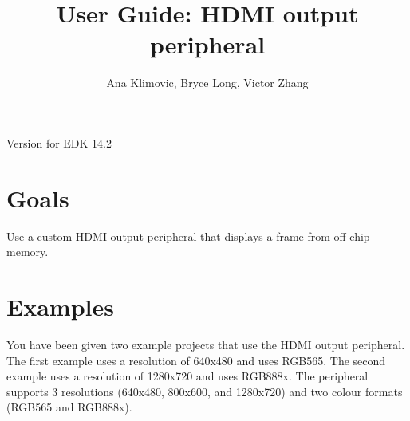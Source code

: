 \documentclass[12pt]{article}
\title{User Guide: HDMI output peripheral}
\author{Ana Klimovic, Bryce Long, Victor Zhang}
\begin{document}
  \maketitle
  Version for EDK 14.2
  \section{Goals}
  Use a custom HDMI output peripheral that displays a frame from off-chip memory.
  \section{Examples}
  You have been given two example projects that use the HDMI output peripheral. The first example uses a resolution of 640x480 and uses RGB565. The second example uses a resolution of 1280x720 and uses RGB888x. The peripheral supports 3 resolutions (640x480, 800x600, and 1280x720) and two colour formats (RGB565 and RGB888x).
\end{document}
